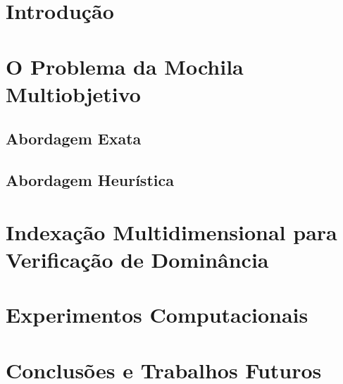 \documentclass[
12pt,				%
twoside,			%
a4paper,			%
portugues,			%
brazil,				%
]{abntex2}
\begin{document}
\imprimircapa
\imprimirfolhaderosto*


\newpage \phantom{a}



\tableofcontents*
\cleardoublepage

\listoffigures*
\cleardoublepage

\listoftables*
\cleardoublepage



\chapter{Introdução}


\chapter{O Problema da Mochila Multiobjetivo}
\label{cap:mokp}

\section{Abordagem Exata}
\label{sec:exato}

\section{Abordagem Heurística}
\label{sec:mh}


\chapter{Indexação Multidimensional para Verificação de Dominância}
\label{cap:kdtree}


\chapter{Experimentos Computacionais}
\label{cap:exp}


\chapter{Conclusões e Trabalhos Futuros}
\label{cap:concl}



\postextual


\end{document}
